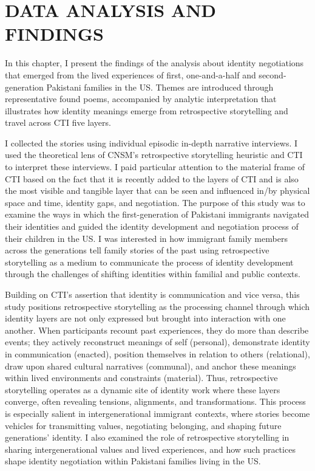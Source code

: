 \chapter{\texorpdfstring{DATA ANALYSIS AND FINDINGS}{}} %

In this chapter, I present the findings of the analysis about identity negotiations that emerged from the lived experiences of first, one-and-a-half and second-generation Pakistani families in the US. Themes are introduced through representative found poems, accompanied by analytic interpretation that illustrates how identity meanings emerge from retrospective storytelling and travel across CTI five layers.

I collected the stories using individual episodic in-depth narrative interviews. I used the theoretical lens of CNSM’s retrospective storytelling heuristic and CTI to interpret these interviews. I paid particular attention to the material frame of CTI based on the fact that it is recently added to the layers of CTI and is also the most visible and tangible layer that can be seen and influenced in/by physical space and time, identity gaps, and negotiation. The purpose of this study was to examine the ways in which the first-generation of Pakistani immigrants navigated their identities and guided the identity development and negotiation process of their children in the US. I was interested in how immigrant family members across the generations tell family stories of the past using retrospective storytelling as a medium to communicate the process of identity development through the challenges of shifting identities within familial and public contexts. 

Building on CTI’s assertion that identity is communication and vice versa, this study positions retrospective storytelling as the processing channel through which identity layers are not only expressed but brought into interaction with one another. When participants recount past experiences, they do more than describe events; they actively reconstruct meanings of self (personal), demonstrate identity in communication (enacted), position themselves in relation to others (relational), draw upon shared cultural narratives (communal), and anchor these meanings within lived environments and constraints (material). Thus, retrospective storytelling operates as a dynamic site of identity work where these layers converge, often revealing tensions, alignments, and transformations. This process is especially salient in intergenerational immigrant contexts, where stories become vehicles for transmitting values, negotiating belonging, and shaping future generations’ identity. I also examined the role of retrospective storytelling in sharing intergenerational values and lived experiences, and how such practices shape identity negotiation within Pakistani families living in the US. 

